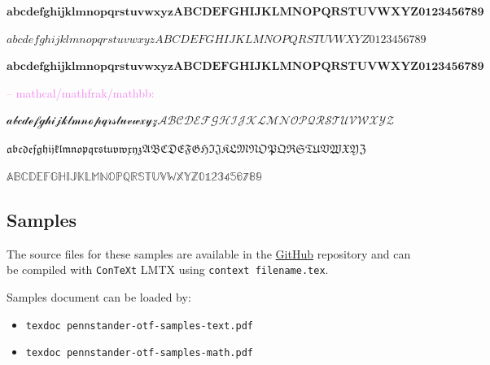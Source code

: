 \documentclass[a4paper]{scrartcl}
\newcommand{\abc}{abcdefghijklmnopqrstuvwxyz}
\newcommand{\ABC}{ABCDEFGHIJKLMNOPQRSTUVWXYZ}
\newcommand{\samplenumbers}{0123456789}
\begin{document}
$\mathbf{\abc\ABC\samplenumbers}$

$\mathit{\abc\ABC\samplenumbers}$

$\mathit{\mathbf{\abc\ABC\samplenumbers}}$

\smallskip

\textcolor{violet}{-- mathcal/mathfrak/mathbb:}

$\mathcal{\abc\ABC}$

$\mathfrak{\abc\ABC}$

$\mathbb{\ABC\samplenumbers}$

\subsection{Samples}

The source files for these samples are available in the \href{github.com/juliusross1}{GitHub} repository and can be compiled with \texttt{ConTeXt} LMTX using \texttt{context filename.tex}.

\smallskip

Samples document can be loaded by:

\begin{itemize}
  \item \texttt{texdoc pennstander-otf-samples-text.pdf}
  \item \texttt{texdoc pennstander-otf-samples-math.pdf}
\end{itemize}
\end{document}
